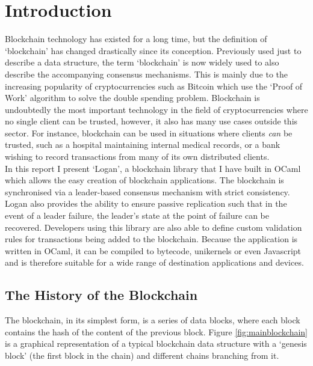 \documentclass[12pt,a4paper,twoside,openright]{report}
\begin{document}
	
	\pagestyle{headings}
	
	\chapter{Introduction}
	Blockchain technology has existed for a long time, but the definition of `blockchain' has changed drastically since its conception.
	Previously used just to describe a data structure, the term `blockchain' is now widely used to also describe the accompanying consensus mechanisms.
	This is mainly due to the increasing popularity of cryptocurrencies such as Bitcoin \parencite{Bitcoin} which use the `Proof of Work' algorithm to solve the double spending problem.
	Blockchain is undoubtedly the most important technology in the field of cryptocurrencies where no single client can be trusted, however, it also has many use cases outside this sector.
	For instance, blockchain can be used in situations where clients \textit{can} be trusted, such as a hospital maintaining internal medical records, or a bank wishing to record transactions from many of its own distributed clients.\\
	
	In this report I present `Logan', a blockchain library that I have built in OCaml which allows the easy creation of blockchain applications.
	The blockchain is synchronised via a leader-based consensus mechanism with strict consistency.
	Logan also provides the ability to ensure passive replication such that in the event of a leader failure, the leader's state at the point of failure can be recovered.
	Developers using this library are also able to define custom validation rules for transactions being added to the blockchain.
	Because the application is written in OCaml, it can be compiled to bytecode, unikernels or even Javascript and is therefore suitable for a wide range of destination applications and devices.

	\section{The History of the Blockchain}
	The blockchain, in its simplest form, is a series of data blocks, where each block contains the hash of the content of the previous block. 
	Figure \ref{fig:mainblockchain} is a graphical representation of a typical blockchain data structure with a `genesis block' (the first block in the chain) and different chains branching from it.\\
\end{document}
